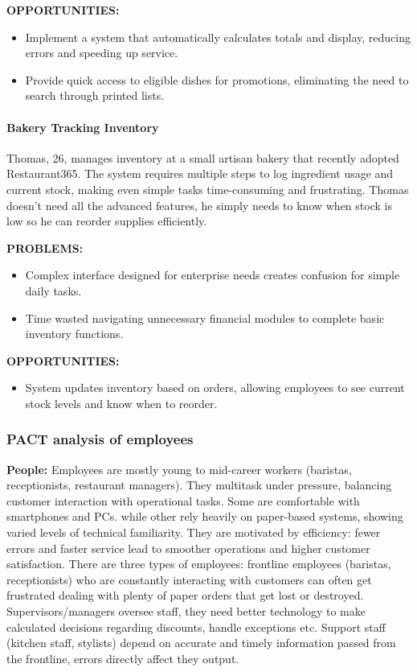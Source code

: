 \documentclass[]{VUMIFTemplateClass}
\newcommand{\subsubsubsection}[1]{\paragraph{#1}}
\begin{document}
\textbf{OPPORTUNITIES:}
\begin{itemize}
    \item Implement a system that automatically calculates totals and display, reducing errors and speeding up service.
    \item Provide quick access to eligible dishes for promotions, eliminating the need to search through printed lists.
\end{itemize}




\subsubsubsection{Bakery Tracking Inventory}
\label{subsubsubsec:bakery-inventory}

Thomas, 26, manages inventory at a small artisan bakery that recently adopted Restaurant365. The system requires multiple steps to log ingredient usage and current stock, making even simple tasks time-consuming and frustrating. Thomas doesn’t need all the advanced features, he simply needs to know when stock is low so he can reorder supplies efficiently.

\textbf{PROBLEMS:}
\begin{itemize}
    \item Complex interface designed for enterprise needs creates confusion for simple daily tasks.
    \item Time wasted navigating unnecessary financial modules to complete basic inventory functions.
\end{itemize}

\textbf{OPPORTUNITIES:}
\begin{itemize}
    \item System updates inventory based on orders, allowing employees to see current stock levels and know when to reorder.
\end{itemize}


\subsubsection{PACT analysis of employees}
    \textbf{People:} Employees are mostly young to mid-career workers (baristas, receptionists, restaurant managers). They multitask under pressure, balancing customer interaction with operational tasks. Some are comfortable with smartphones and PCs. while other rely heavily on paper-based systems, showing varied levels of technical familiarity. They are motivated by efficiency: fewer errors and faster service lead to smoother operations and higher customer satisfaction. There are three types of employees: frontline employees (baristas, receptionists) who are constantly interacting with customers can often get frustrated dealing with plenty of paper orders that get lost or destroyed. Supervisors/managers oversee staff, they need better technology to make calculated decisions regarding discounts, handle exceptions etc. Support staff (kitchen staff, stylists) depend on accurate and timely information passed from the frontline, errors directly affect they output.
    
\end{document}
